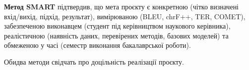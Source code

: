 \documentclass[14pt]{extarticle}
\begin{document}
\textbf{Метод SMART} підтвердив, що мета проєкту є конкретною (чітко визначені вхід/вихід, підхід, результат), вимірюваною (BLEU, chrF++, TER, COMET), забезпеченою виконавцем (студент під керівництвом наукового керівника), реалістичною (наявність даних, перевірених методів, базових моделей) та обмеженою у часі (семестр виконання бакалаврської роботи).

Обидва методи свідчать про доцільність реалізації проєкту.
\end{document}
